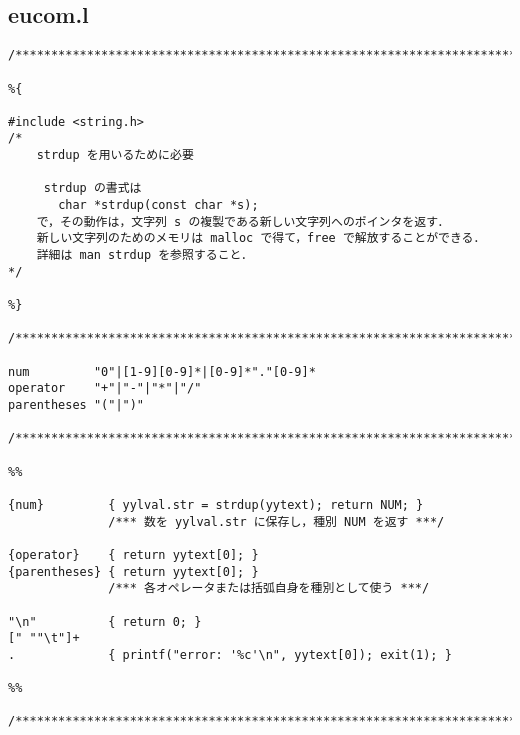 \documentclass[a4j]{jsarticle}  %
\begin{document}
\subsection{eucom.l}
\begin{verbatim}
/*****************************************************************************/

%{

#include <string.h>
/* 
    strdup を用いるために必要

     strdup の書式は
       char *strdup(const char *s);
    で，その動作は，文字列 s の複製である新しい文字列へのポインタを返す．
    新しい文字列のためのメモリは malloc で得て，free で解放することができる．
    詳細は man strdup を参照すること．
*/
                    
%}

/*****************************************************************************/

num         "0"|[1-9][0-9]*|[0-9]*"."[0-9]*
operator    "+"|"-"|"*"|"/"
parentheses "("|")"

/*****************************************************************************/

%%

{num}         { yylval.str = strdup(yytext); return NUM; }
              /*** 数を yylval.str に保存し，種別 NUM を返す ***/

{operator}    { return yytext[0]; }
{parentheses} { return yytext[0]; }
              /*** 各オペレータまたは括弧自身を種別として使う ***/

"\n"          { return 0; }
[" ""\t"]+
.             { printf("error: '%c'\n", yytext[0]); exit(1); }

%%

/*****************************************************************************/
\end{verbatim}
\end{document}
